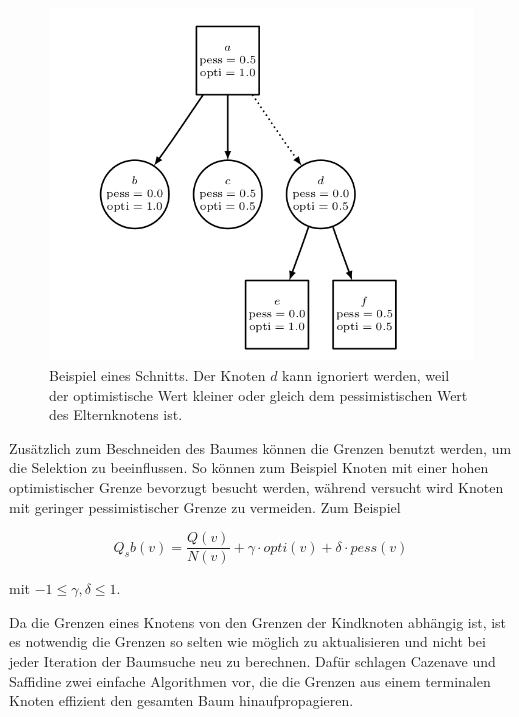 \pagebreak[4]
\begin{figure}
	\centering
	\includegraphics[width=0.7\linewidth]{scorebound_cut_big}
	\caption{Beispiel eines Schnitts. Der Knoten $d$ kann ignoriert werden, weil der optimistische Wert kleiner oder gleich dem pessimistischen Wert des Elternknotens ist.\footnotemark}
	\label{fig:scoreboundcut}
\end{figure}

Zusätzlich zum Beschneiden des Baumes können die Grenzen benutzt werden, um die Selektion zu beeinflussen.
So können zum Beispiel Knoten mit einer hohen optimistischer Grenze bevorzugt besucht werden, während versucht wird Knoten mit geringer pessimistischer Grenze zu vermeiden.
Zum Beispiel

\begin{equation}
Q_sb(v) = \frac{Q(v)}{N(v)} + \gamma \cdot opti(v) + \delta \cdot pess(v)
\label{eqn:scorebound}
\end{equation}

mit $-1 \le \gamma, \delta \le 1$.

Da die Grenzen eines Knotens von den Grenzen der Kindknoten abhängig ist, ist es notwendig die Grenzen so selten wie möglich zu aktualisieren und nicht bei jeder Iteration der Baumsuche neu zu berechnen.
Dafür schlagen Cazenave und Saffidine zwei einfache Algorithmen vor, die die Grenzen aus einem terminalen Knoten effizient den gesamten Baum hinaufpropagieren.


